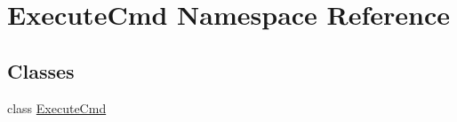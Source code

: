 \hypertarget{namespaceExecuteCmd}{\section{Execute\-Cmd Namespace Reference}
\label{namespaceExecuteCmd}
}
\subsection*{Classes}
\begin{DoxyCompactItemize}
\item 
class \hyperlink{classExecuteCmd_1_1ExecuteCmd}{Execute\-Cmd}
\end{DoxyCompactItemize}
